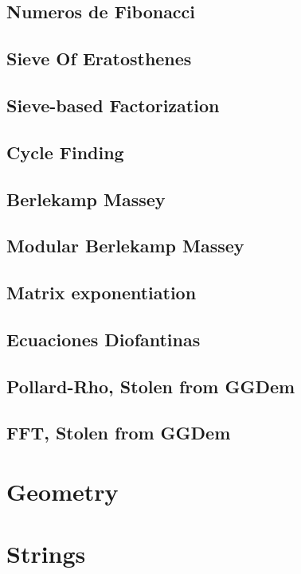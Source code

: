 \subsection{Numeros de Fibonacci}
\subsection{Sieve Of Eratosthenes}
\subsection{Sieve-based Factorization}
\subsection{Cycle Finding}
\subsection{Berlekamp Massey}
\subsection{Modular Berlekamp Massey}
\subsection{Matrix exponentiation}
\subsection{Ecuaciones Diofantinas}
\subsection{Pollard-Rho, Stolen from GGDem}
\subsection{FFT, Stolen from GGDem}

\section{Geometry}


\section{Strings}
